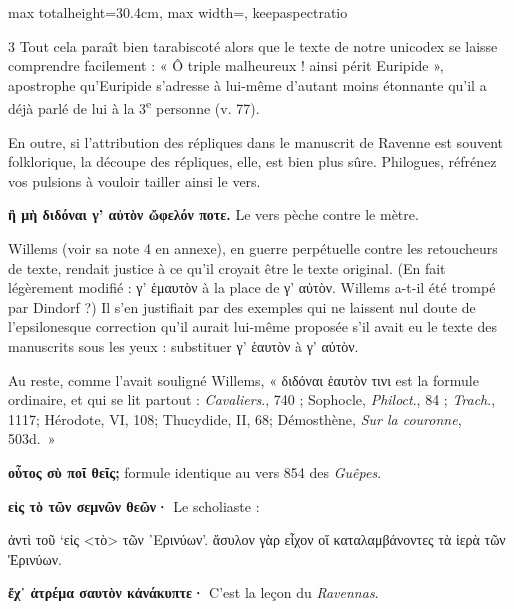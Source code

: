 \documentclass[11pt,twoside]{book}
\newcommand{\italique}[1]{\textit{#1}}
\newcommand{\citComm}[1]{\begin{quoting}[vskip=0.4pt,leftmargin=0.7em,rightmargin=0.2em]#1\end{quoting}}
\newcommand{\nieme}[1]{#1\textsuperscript{e}}
\begin{document}
\begin{adjustbox}{max totalheight=30.4cm, max width=\textwidth, keepaspectratio}
\begin{minipage}{\textwidth}
{\begin{multicols}{3}
\noindent Tout cela paraît bien tarabiscoté alors que le texte de notre unicodex se laisse comprendre facilement : « Ô triple malheureux ! ainsi périt Euripide », apostrophe qu'Euripide s'adresse à lui-même d'autant moins étonnante qu'il a déjà parlé de lui à la \nieme{3} personne (v. 77).
\par\vspace{1.5pt}
\noindent En outre, si l'attribution des répliques dans le manuscrit de Ravenne est souvent folklorique, la découpe des répliques, elle, est bien plus sûre. Philogues, réfrénez vos pulsions à vouloir tailler ainsi le vers.
\par\vspace{1.5pt}
 \textbf{ἢ μὴ διδόναι γ' αὐτὸν ὤφελόν ποτε.} Le vers pèche contre le mètre.
\par\vspace{1.5pt}
\noindent Willems (voir sa note 4 en annexe), en guerre perpétuelle contre les retoucheurs de texte, rendait justice à ce qu'il croyait être le texte original. (En fait légèrement modifié : γ' ἑμαυτὸν à la place de γ' αὐτὸν. Willems a-t-il été trompé par Dindorf ?)  Il s'en justifiait par des exemples qui ne laissent nul doute de l'epsilonesque correction qu'il aurait lui-même proposée s'il avait eu le texte des manuscrits sous les yeux : substituer γ' ἑαυτὸν à γ' αὐτὸν.\\
\par\vspace{1.5pt}
\noindent Au reste, comme l'avait souligné Willems, « διδόναι ἑαυτὸν τινι est la formule ordinaire, et qui se lit partout : \italique{Cavaliers}., 740 ; Sophocle, \italique{Philoct}., 84 ; \italique{Trach}., 1117; Hérodote, VI, 108; Thucydide, II, 68; Démosthène, \italique{Sur la couronne}, 503d.~»
\par\vspace{1.5pt}
 \textbf{οὗτος σὺ ποῖ θεῖς;} formule identique au vers 854 des \italique{Guêpes}.
\par\vspace{1.5pt}
 \textbf{εἰς τὸ τῶν σεμνῶν θεῶν·} Le scholiaste :
\citComm{ἀντὶ τοῦ `εἰς <τὸ> τῶν ᾿Ερινύων'. ἄσυλον γὰρ εἶχον οἵ καταλαμβάνοντες τὰ ἱερὰ τῶν Ἐρινύων.}
\par\vspace{1.5pt}
 \textbf{ἔχ᾽ ἀτρέμα σαυτὸν κἀνάκυπτε·} C'est la leçon du \italique{Ravennas}.
\par\vspace{1.5pt}

\end{multicols}}
\end{minipage}
\end{adjustbox}
\end{document}
